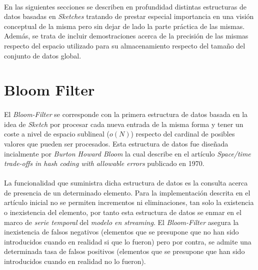 \documentclass{subfiles}
\begin{document}
    \paragraph{}
    En las siguientes secciones se describen en profundidad distintas estructuras de datos basadas en \emph{Sketches} tratando de prestar especial importancia en una visión conceptual de la misma pero sin dejar de lado la parte práctica de las mismas. Además, se trata de incluir demostraciones acerca de la precisión de las mismas respecto del espacio utilizado para su almacenamiento respecto del tamaño del conjunto de datos global.


    \section{Bloom Filter}
    \label{sec:bloom_filter}

      \paragraph{}
      El \emph{Bloom-Filter} se corresponde con la primera estructura de datos basada en la idea de \emph{Sketch} por procesar cada nueva entrada de la misma forma y tener un coste a nivel de espacio sublineal ($o(N)$) respecto del cardinal de posibles valores que pueden ser procesados. Esta estructura de datos fue diseñada incialmente por \emph{Burton Howard Bloom} la cual describe en el artículo \emph{Space/time trade-offs in hash coding with allowable errors} \cite{bloom1970space} publicado en 1970.

      \paragraph{}
      La funcionalidad que suministra dicha estructura de datos es la consulta acerca de presencia de un determinado elemento. Para la implementación descrita en el artículo inicial no se permiten incrementos ni eliminaciones, tan solo la existencia o inexistencia del elemento, por tanto esta estructura de datos se enmar en el marco de \emph{serie temporal} del \emph{modelo en streaming}. El \emph{Bloom-Filter} asegura la inexistencia de falsos negativos (elementos que se presupone que no han sido introducidos cuando en realidad si que lo fueron) pero por contra, se admite una determinada tasa de falsos positivos (elementos que se presupone que han sido introducidos cuando en realidad no lo fueron).
\end{document}
